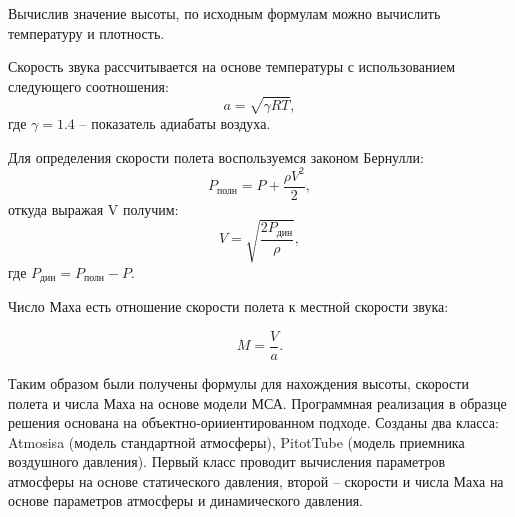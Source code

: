 Вычислив значение высоты, по исходным формулам можно вычислить температуру и плотность. 

Скорость звука рассчитывается на основе температуры с использованием следующего соотношения:
$$a=\sqrt{\gamma RT},$$
где $\gamma=1.4$ – показатель адиабаты воздуха.

Для определения скорости полета воспользуемся законом Бернулли:
$$P_\text{полн}=P+\frac{\rho V^2}{2},$$
откуда выражая V получим:
$$V=\sqrt{\frac{2P_\text{дин}}{\rho}},$$
где $P_\text{дин}=P_\text{полн}-P$.

Число Маха есть отношение скорости полета к местной скорости звука:

$$M=\frac{V}{a}.$$

Таким образом были получены формулы для нахождения высоты, скорости полета и числа Маха на основе модели МСА. 
Программная реализация в образце решения основана на объектно-орииентированном подходе. Созданы два класса: 
Atmosisa (модель стандартной атмосферы), PitotTube (модель приемника воздушного давления). Первый класс 
проводит вычисления параметров атмосферы на основе статического давления, второй – скорости и числа Маха 
на основе параметров атмосферы и динамического давления.


